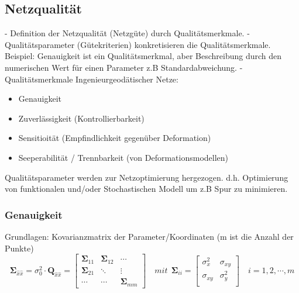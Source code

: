\documentclass[12pt]{article}
\begin{document}
\subsection{Netzqualität}
- Definition der Netzqualität (Netzgüte) durch Qualitätsmerkmale.
\newline
- Qualitätsparameter (Gütekriterien) konkretisieren die Qualitätsmerkmale.
\newline
Beispiel: Genauigkeit ist ein Qualitätsmerkmal, aber Beschreibung durch den numerischen Wert für einen Parameter z.B Standardabweichung.
\newline
- Qualitätsmerkmale Ingenieurgeodätischer Netze:
\begin{itemize}
\item Genauigkeit
\item Zuverlässigkeit (Kontrollierbarkeit)
\item Sensitioität (Empfindlichkeit gegenüber Deformation)
\item Seeperabilität / Trennbarkeit (von Deformationsmodellen)
\end{itemize}
Qualitätsparameter werden zur Netzoptimierung hergezogen. d.h. Optimierung von funktionalen und/oder Stochastischen Modell um z.B Spur zu minimieren. 
\subsubsection{Genauigkeit}
Grundlagen: Kovarianzmatrix der Parameter/Koordinaten (m ist die Anzahl der Punkte)
\begin{equation*}
\bm{\Sigma}_{\hat{x}\hat{x}} = \sigma_0^2 \cdot \bm{Q}_{\hat{x}\hat{x}} = 
\begin{bmatrix}
\bm{\Sigma}_{11} & \bm{\Sigma}_{12} & \cdots \\
\bm{\Sigma}_{21} & \ddots      & \vdots \\
\cdots & \cdots & \bm{\Sigma}_{mm}
\end{bmatrix} \quad 
mit\ \ \bm{\Sigma}_{ii} = \begin{bmatrix}
\sigma_x^2 & \sigma_{xy} \\
\sigma_{xy} & \sigma_y^2 \\
\end{bmatrix} \quad  i = 1,2,\cdots, m
\end{equation*}
\end{document}
